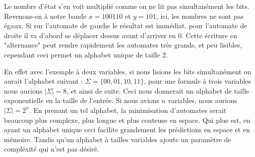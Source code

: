 Le nombre d'état s'en voit multiplié comme on ne lit pas simultanément les bits. Revenons-en à notre bande $x = 100110$ et $y = 101$, ici, les nombres ne sont pas égaux. Si sur l'automate de gauche le résultat est immédiat, pour l'automate de droite il va d'abord se déplacer dessus avant d'arriver en 0. Cette écriture en "alternance" peut rendre rapidement les automates très grands, et peu lisibles, cependant ceci permet un alphabet unique de taille 2.\\\par

En effet avec l'exemple à deux variables, si nous lisions les bits simultanément on aurait l'alphabet suivant : $\Sigma = \{00, 01, 10, 11\}$, pour une formule à trois variables nous aurions $|\Sigma| = 8$, et ainsi de suite. Ceci nous donnerait un alphabet de taille exponentielle en la taille de l'entrée. Si nous avions $n$ variables, nous aurions $|\Sigma| = 2^n$. En prenant un tel alphabet, la minimisation d'automates serait beaucoup plus complexe, plus longue et plus couteuse en espace. Qui plus est, en ayant un alphabet unique ceci facilite grandement les prédictions en espace et en mémoire. Tandis qu'un alphabet à tailles variables ajoute un paramètre de compléxité qui n'est pas désiré.
